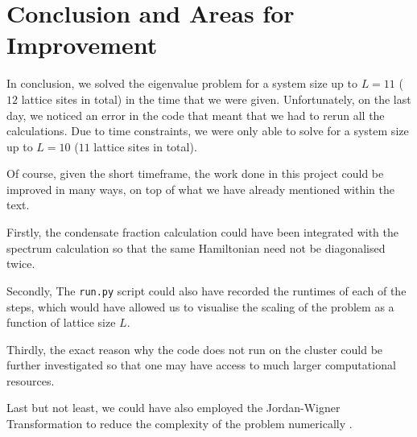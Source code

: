 \section{Conclusion and Areas for Improvement}
    In conclusion, we solved the eigenvalue problem for a system size up to $L = 11$ ($12$ lattice sites in total) in the time that we were given. Unfortunately, on the last day, we noticed an error in the code that meant that we had to rerun all the calculations. Due to time constraints, we were only able to solve for a system size up to $L = 10$ ($11$ lattice sites in total).

    Of course, given the short timeframe, the work done in this project could be improved in many ways, on top of what we have already mentioned within the text. 
    
    Firstly, the condensate fraction calculation could have been integrated with the spectrum calculation so that the same Hamiltonian need not be diagonalised twice. 
    
    Secondly, The \texttt{run.py} script could also have recorded the runtimes of each of the steps, which would have allowed us to visualise the scaling of the problem as a function of lattice size $L$. 

    Thirdly, the exact reason why the code does not run on the cluster could be further investigated so that one may have access to much larger computational resources.

    Last but not least, we could have also employed the Jordan-Wigner Transformation to reduce the complexity of the problem numerically \cite{wilkeSymmetryprotectedBoseEinsteinCondensation2022}. 

    

    